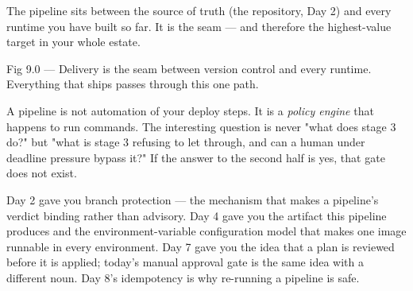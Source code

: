  The pipeline sits between the source of truth (the repository, Day 2) and every runtime you have built so far. It is the seam --- and therefore the highest-value target in your whole estate.

\begin{wbfigure}{Fig 9.0 — Delivery is the seam between version control and every runtime. Everything that ships passes through this one path.}
\end{wbfigure}

\begin{keyidea}
A pipeline is not automation of your deploy steps. It is a \emph{policy engine} that happens to run commands. The interesting question is never "what does stage 3 do?" but "what is stage 3 refusing to let through, and can a human under deadline pressure bypass it?" If the answer to the second half is yes, that gate does not exist.
\end{keyidea}

 Day 2 gave you branch protection --- the mechanism that makes a pipeline's verdict binding rather than advisory. Day 4 gave you the artifact this pipeline produces and the environment-variable configuration model that makes one image runnable in every environment. Day 7 gave you the idea that a plan is reviewed before it is applied; today's manual approval gate is the same idea with a different noun. Day 8's idempotency is why re-running a pipeline is safe.


